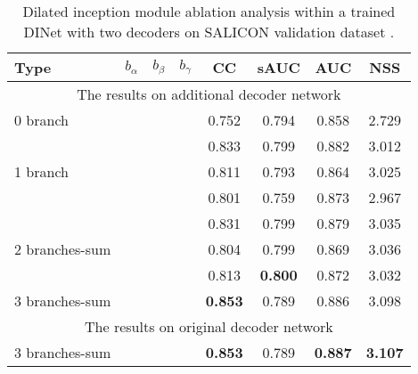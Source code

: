 \begin{table}[]
	\centering
	\scriptsize
	\caption{
Dilated inception module ablation analysis within a trained DINet with two decoders on SALICON validation dataset \cite{jiang2015salicon}.
	}
	\label{table:dimaa1}
	\begin{tabular}{|l|ccc|cccc|}
		\hline
		Type                          &$b_\alpha$ & $b_\beta$ &$b_\gamma$ & CC    & sAUC  & AUC   & NSS   \\ \hline \hline
		\multicolumn{8}{|c|}{The results on additional decoder network}               \\ \hline
		0 branch                 &    &    &    &  0.752  & 0.794 & 0.858 & 2.729 \\ \hline
		\multirow{3}{*}{1 branch}     & \checkmark  &    &    & 0.833 & 0.799 & 0.882 & 3.012 \\ \cline{2-8} 
		&    & \checkmark  &    & 0.811  & 0.793 & 0.864 & 3.025 \\ \cline{2-8} 
		&    &    & \checkmark  & 0.801 & 0.759  & 0.873 & 2.967  \\ \hline
		\multirow{3}{*}{2 branches-sum} & \checkmark  & \checkmark  &    & 0.831 & 0.799 & 0.879  & 3.035 \\ \cline{2-8} 
		& \checkmark  &    & \checkmark  & 0.804 &0.799 & 0.869 & 3.036 \\ \cline{2-8} 
		&    & \checkmark  & \checkmark  & 0.813 &\textbf{0.800} & 0.872 & 3.032 \\ \hline
		3 branches-sum                 & \checkmark  & \checkmark  & \checkmark  & \textbf{0.853} & 0.789 & 0.886 & 3.098 \\ \hline \hline
		\multicolumn{8}{|c|}{The results on original decoder network}               \\ \hline
		3 branches-sum                 & \checkmark  & \checkmark  & \checkmark  & \textbf{0.853} & 0.789 & \textbf{0.887} & \textbf{3.107} \\ \hline		
	\end{tabular}
\vspace{-4mm}
\end{table}

